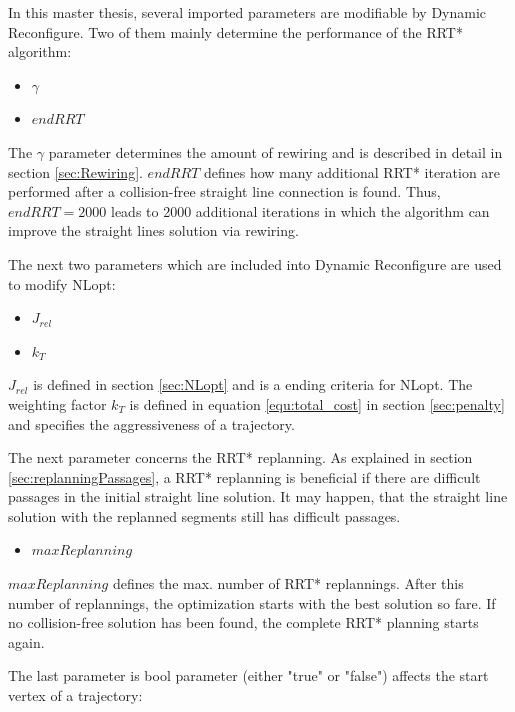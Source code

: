 In this master thesis, several imported parameters are modifiable by Dynamic Reconfigure. Two of them mainly determine the performance of the RRT* algorithm:

\begin{itemize}
  \item $\gamma$
  \item $endRRT$
\end{itemize}

The $\gamma$ parameter determines the amount of rewiring and is described in detail in section \ref{sec:Rewiring}. $endRRT$ defines how many additional RRT* iteration are performed after a collision-free straight line connection is found. Thus, $endRRT = 2000$ leads to 2000 additional iterations in which the algorithm can improve the straight lines solution via rewiring. \newline

The next two parameters which are included into Dynamic Reconfigure are used to modify NLopt:

\begin{itemize}
  \item $J_{rel}$
  \item $k_T$
\end{itemize}


$J_{rel}$ is defined in section \ref{sec:NLopt} and is a ending criteria for NLopt. The weighting factor $k_T$ is defined in equation \ref{equ:total_cost} in section \ref{sec:penalty} and specifies the aggressiveness of a trajectory. \newline

The next parameter concerns the RRT* replanning. As explained in section \ref{sec:replanningPassages}, a RRT* replanning is beneficial if there are difficult passages in the initial straight line solution. It may happen, that the straight line solution with the replanned segments still has difficult passages. 

\begin{itemize}
  \item $maxReplanning$
\end{itemize}

$maxReplanning$ defines the max. number of RRT* replannings. After this number of replannings, the optimization starts with the best solution so fare. If no collision-free solution has been found, the complete RRT* planning starts again. \newline

The last parameter is bool parameter (either "true" or "false") affects the start vertex of a trajectory:

